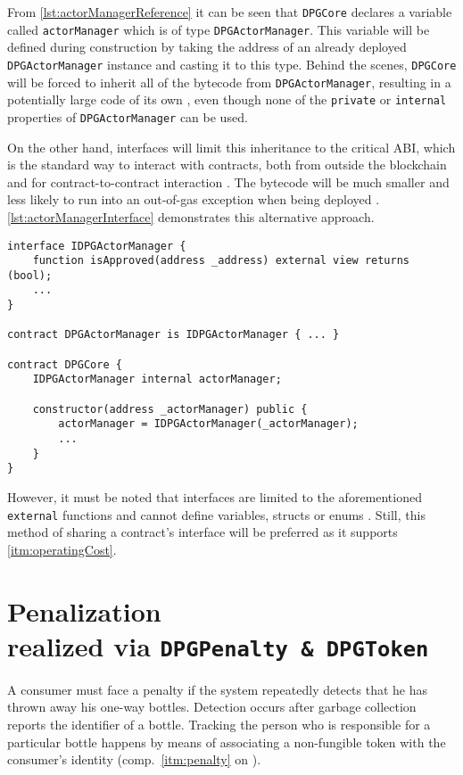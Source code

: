 From \autoref{lst:actorManagerReference} it can be seen that \texttt{DPGCore} declares a variable called \texttt{actorManager} which is of type \texttt{DPGActorManager}. This variable will be defined during construction by taking the address of an already deployed \texttt{DPGActorManager} instance and casting it to this type. Behind the scenes, \texttt{DPGCore} will be forced to inherit all of the bytecode from \texttt{DPGActorManager}, resulting in a potentially large code of its own \cite{interfaces}, even though none of the \texttt{private} or \texttt{internal} properties of \texttt{DPGActorManager} can be used. 

On the other hand, interfaces will limit this inheritance to the critical \ac{ABI}, which is the standard way to interact with contracts, both from outside the blockchain and for contract-to-contract interaction \cite[pp.~93, 133]{solidityDocs}. The bytecode will be much smaller and less likely to run into an out-of-gas exception when being deployed \cite{interfaces}. \autoref{lst:actorManagerInterface} demonstrates this alternative approach. 

\pagebreak

\begin{lstlisting}[language=Solidity, caption=Sharing external contract interface via interfaces, label=lst:actorManagerInterface]
interface IDPGActorManager {
	function isApproved(address _address) external view returns (bool);
	...
}

contract DPGActorManager is IDPGActorManager { ... }

contract DPGCore {
	IDPGActorManager internal actorManager;
	
	constructor(address _actorManager) public {
		actorManager = IDPGActorManager(_actorManager);
		...
	}
}
\end{lstlisting}

However, it must be noted that interfaces are limited to the aforementioned \texttt{external} functions and cannot define variables, structs or enums \cite[p.~92]{solidityDocs}. Still, this method of sharing a contract's interface will be preferred as it supports \ref{itm:operatingCost}.

\pagebreak

\section[Penalization]{Penalization \\ {\normalsize realized via \texttt{DPGPenalty \& DPGToken}}}
A consumer must face a penalty if the system repeatedly detects that he has thrown away his one-way bottles. Detection occurs after garbage collection reports the identifier of a bottle. Tracking the person who is responsible for a particular bottle happens by means of associating a non-fungible token with the consumer's identity (comp.~\ref{itm:penalty} on ).


